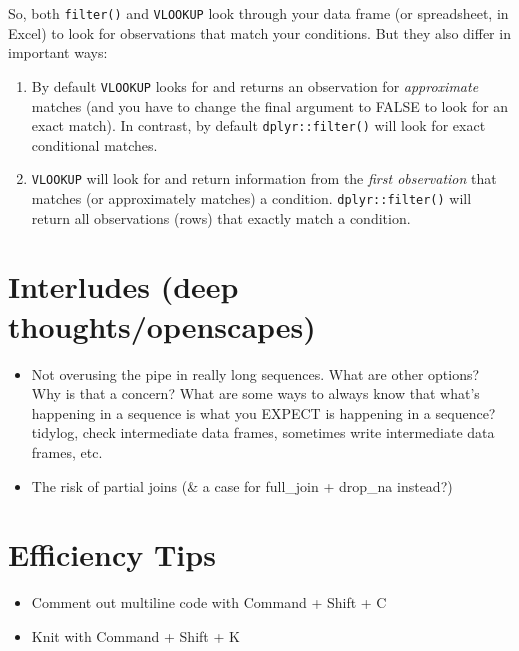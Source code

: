 \documentclass[]{book}
\providecommand{\tightlist}{%
  \setlength{\itemsep}{0pt}\setlength{\parskip}{0pt}}
\begin{document}
So, both \texttt{filter()} and \texttt{VLOOKUP} look through your data frame (or spreadsheet, in Excel) to look for observations that match your conditions. But they also differ in important ways:

\begin{enumerate}
\def\labelenumi{(\arabic{enumi})}
\item
  By default \texttt{VLOOKUP} looks for and returns an observation for \emph{approximate} matches (and you have to change the final argument to FALSE to look for an exact match). In contrast, by default \texttt{dplyr::filter()} will look for exact conditional matches.
\item
  \texttt{VLOOKUP} will look for and return information from the \emph{first observation} that matches (or approximately matches) a condition. \texttt{dplyr::filter()} will return all observations (rows) that exactly match a condition.
\end{enumerate}

\hypertarget{interludes-deep-thoughtsopenscapes-5}{%
\section{Interludes (deep thoughts/openscapes)}\label{interludes-deep-thoughtsopenscapes-5}}

\begin{itemize}
\item
  Not overusing the pipe in really long sequences. What are other options? Why is that a concern? What are some ways to always know that what's happening in a sequence is what you EXPECT is happening in a sequence? tidylog, check intermediate data frames, sometimes write intermediate data frames, etc.
\item
  The risk of partial joins (\& a case for full\_join + drop\_na instead?)
\end{itemize}

\hypertarget{efficiency-tips-6}{%
\section{Efficiency Tips}\label{efficiency-tips-6}}

\begin{itemize}
\tightlist
\item
  Comment out multiline code with Command + Shift + C
\item
  Knit with Command + Shift + K
\end{itemize}
\end{document}
